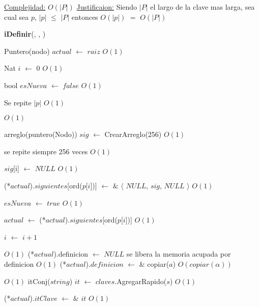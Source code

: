 \begin{Algoritmos}
\begin{algorithm}[H]
\begin{algorithmic}[1]
\medskip
\State \underline{Complejidad:} $O(|P|)$
\State \underline{Justificaion:} Siendo $|P|$ el largo de la clave mas larga, sea cual sea $p$, $|p|$ $\leq$ $|P|$ entonces 	$O(|p|)$ $=$ $O(|P|)$

\end{algorithmic}
\end{algorithm}
  

\begin{algorithm}[H]
{\textbf{iDefinir}(, , )}
\begin{algorithmic}[1]

\State Puntero(nodo) $actual$ $\gets$ $raiz$ \Comment $O(1)$

\State Nat $i$ $\gets$ $0$ \Comment $O(1)$

\State bool $esNueva$ $\gets$ $false$ \Comment $O(1)$

   \Comment Se repite $|p|$ $O(1)$
	
	
	 \Comment $O(1)$
	
		\State arreglo(puntero(Nodo)) $sig$ $\gets$ CrearArreglo(256) \Comment $O(1)$
		
		 \Comment se repite siempre 256 veces $O(1)$
		
			\State $sig$[i] $\gets$ $NULL$ \Comment $O(1)$
		
		\EndFor
		
		\State (*$actual$).$siguientes$[ord($p$[$i$])] $\gets$	 $\&$ $\langle$ $NULL$, $sig$, $NULL$ $\rangle$  \Comment $O(1)$
		
		\State $esNueva$ $\gets$ $true$ \Comment $O(1)$	 
	
	\EndIf
	
	\State $actual$ $\gets$ (*$actual$).$siguientes$[ord($p$[$i$])] \Comment $O(1)$

	\State $i$ $\gets$ $i + 1$
\EndWhile 

 \Comment $O(1)$
	\State (*$actual$).definicion $\gets$ $NULL$ \Comment se libera la memoria acupada por definicion $O(1)$
\EndIf
\State (*$actual$).$definicion$ $\gets$ $\&$ copiar($a$) \Comment $O(copiar(\alpha))$

 \Comment $O(1)$
	\State itConj($string$) $it$ $\gets$  $claves$.AgregarRapido($s$) \Comment $O(1)$
	
	\State (*$actual$).$itClave$ $\gets$ $\&$ $it$ \Comment $O(1)$
\EndIf


\end{algorithmic}
\end{algorithm}
\end{Algoritmos}
